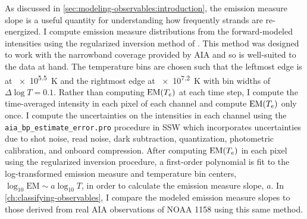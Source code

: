 As discussed in \autoref{sec:modeling-observables:introduction}, the emission measure slope is a useful quantity for understanding how frequently strands are re-energized. I compute emission measure distributions from the forward-modeled intensities using the regularized inversion method of \citet{hannah_differential_2012}. This method was designed to work with the narrowband coverage provided by AIA and so is well-suited to the data at hand. The temperature bins are chosen such that the leftmost edge is at \SI{e5.5}{\kelvin} and the rightmost edge at \SI{e7.2}{\kelvin} with bin widths of $\Delta\log T=0.1$. Rather than computing $\textup{EM}(T_e)$ at each time step, I compute the time-averaged intensity in each pixel of each channel and compute $\textup{EM}(T_e)$ only once. I compute the uncertainties on the intensities in each channel using the \texttt{aia\_bp\_estimate\_error.pro} procedure in SSW which incorporates uncertainties due to shot noise, read noise, dark subtraction, quantization, photometric calibration, and onboard compression. After computing $\textup{EM}(T_e)$ in each pixel using the regularized inversion procedure, a first-order polynomial is fit to the log-transformed emission measure and temperature bin centers, $\log_{10}\mathrm{EM}\sim a\log_{10}T$, in order to calculate the emission measure slope, $a$. In \autoref{ch:classifying-observables}, I compare the modeled emission measure slopes to those derived from real AIA observations of NOAA 1158 using this same method.

